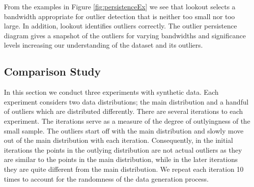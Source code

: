 \documentclass[12pt]{article}
\theoremstyle{definition}
\theoremstyle{definition}
\theoremstyle{definition}
\theoremstyle{remark}
\begin{document}
From the examples in Figure \ref{fig:persistenceEx} we see that lookout selects a bandwidth appropriate for outlier detection that is neither too small nor too large. In addition, lookout identifies outliers correctly. The outlier persistence diagram gives a snapshot of the outliers for varying bandwidths and significance levels increasing our understanding of the dataset and its outliers.

\hypertarget{sec:SyntheticComparison}{%
\subsection{Comparison Study}\label{sec:SyntheticComparison}}

In this section we conduct three experiments with synthetic data. Each experiment considers two data distributions; the main distribution and a handful of outliers which are distributed differently. There are several iterations to each experiment. The iterations serve as a measure of the degree of outlyingness of the small sample. The outliers start off with the main distribution and slowly move out of the main distribution with each iteration. Consequently, in the initial iterations the points in the outlying distribution are not actual outliers as they are similar to the points in the main distribution, while in the later iterations they are quite different from the main distribution. We repeat each iteration 10 times to account for the randomness of the data generation process.
\end{document}
